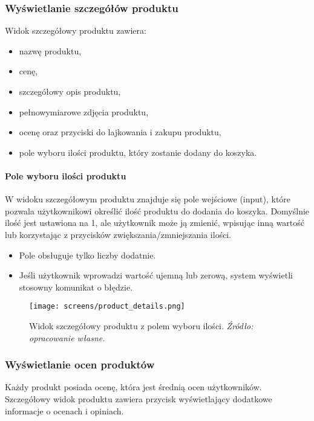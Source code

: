 \documentclass[12pt,a4paper,oneside]{article}
\theoremstyle{definition}
\numberwithin{equation}{section}
\begin{document}
\newpage
\subsubsection{Wyświetlanie szczegółów produktu}
Widok szczegółowy produktu zawiera:
\begin{itemize}
    \item nazwę produktu,
    \item cenę,
    \item szczegółowy opis produktu,
    \item pełnowymiarowe zdjęcia produktu,
    \item ocenę oraz przyciski do lajkowania i zakupu produktu,
    \item pole wyboru ilości produktu, który zostanie dodany do koszyka.
\end{itemize}

\paragraph{Pole wyboru ilości produktu}
W widoku szczegółowym produktu znajduje się pole wejściowe (input), które pozwala użytkownikowi określić ilość produktu do dodania do koszyka. Domyślnie ilość jest ustawiona na 1, ale użytkownik może ją zmienić, wpisując inną wartość lub korzystając z przycisków zwiększania/zmniejszania ilości.

\begin{itemize}
    \item Pole obsługuje tylko liczby dodatnie.
    \item Jeśli użytkownik wprowadzi wartość ujemną lub zerową, system wyświetli stosowny komunikat o błędzie.
\end{itemize}

\begin{figure}[H]
    \centering
    \texttt{[image: screens/product\_details.png]}
    \caption{Widok szczegółowy produktu z polem wyboru ilości. \emph{Źródło: opracowanie własne.}}
    \label{fig:product_details}
\end{figure}







\newpage
\subsubsection{Wyświetlanie ocen produktów}
Każdy produkt posiada ocenę, która jest średnią ocen użytkowników. Szczegółowy widok produktu zawiera przycisk wyświetlający dodatkowe informacje o ocenach i opiniach.
\end{document}
